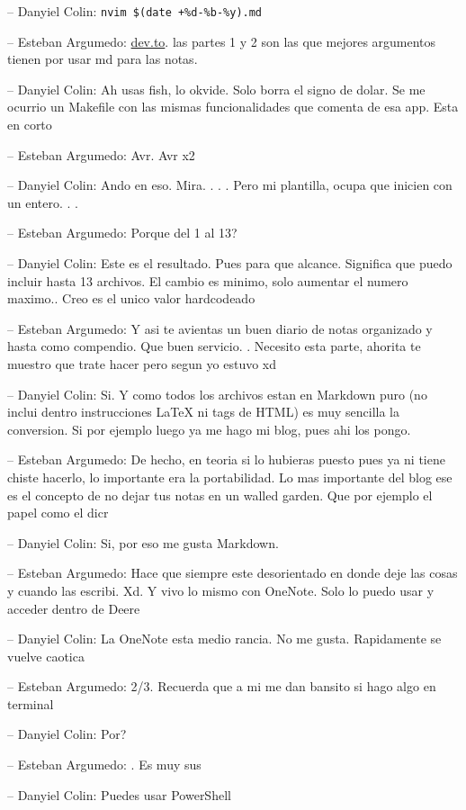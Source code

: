 -- Danyiel Colin: \texttt{nvim\ \$(date\ +\%d-\%b-\%y).md}

-- Esteban Argumedo:
\href{https://dev.to/scottshipp/my-note-taking-process-49pa}{dev.to}.
las partes 1 y 2 son las que mejores argumentos tienen por usar md para
las notas.

-- Danyiel Colin: Ah usas fish, lo okvide. Solo borra el signo de dolar.
Se me ocurrio un Makefile con las mismas funcionalidades que comenta de
esa app. Esta en corto

-- Esteban Argumedo: Avr. Avr x2

-- Danyiel Colin: Ando en eso. Mira. . . . Pero mi plantilla, ocupa que
inicien con un entero. . .

-- Esteban Argumedo: Porque del 1 al 13?

-- Danyiel Colin: Este es el resultado. Pues para que alcance. Significa
que puedo incluir hasta 13 archivos. El cambio es minimo, solo aumentar
el numero maximo.. Creo es el unico valor hardcodeado

-- Esteban Argumedo: Y asi te avientas un buen diario de notas
organizado y hasta como compendio. Que buen servicio. . Necesito esta
parte, ahorita te muestro que trate hacer pero segun yo estuvo xd

-- Danyiel Colin: Si. Y como todos los archivos estan en Markdown puro
(no inclui dentro instrucciones LaTeX ni tags de HTML) es muy sencilla
la conversion. Si por ejemplo luego ya me hago mi blog, pues ahi los
pongo.

-- Esteban Argumedo: De hecho, en teoria si lo hubieras puesto pues ya
ni tiene chiste hacerlo, lo importante era la portabilidad. Lo mas
importante del blog ese es el concepto de no dejar tus notas en un
walled garden. Que por ejemplo el papel como el dicr

-- Danyiel Colin: Si, por eso me gusta Markdown.

-- Esteban Argumedo: Hace que siempre este desorientado en donde deje
las cosas y cuando las escribi. Xd. Y vivo lo mismo con OneNote. Solo lo
puedo usar y acceder dentro de Deere

-- Danyiel Colin: La OneNote esta medio rancia. No me gusta. Rapidamente
se vuelve caotica

-- Esteban Argumedo: 2/3. Recuerda que a mi me dan bansito si hago algo
en terminal

-- Danyiel Colin: Por?

-- Esteban Argumedo: . Es muy sus

-- Danyiel Colin: Puedes usar PowerShell

